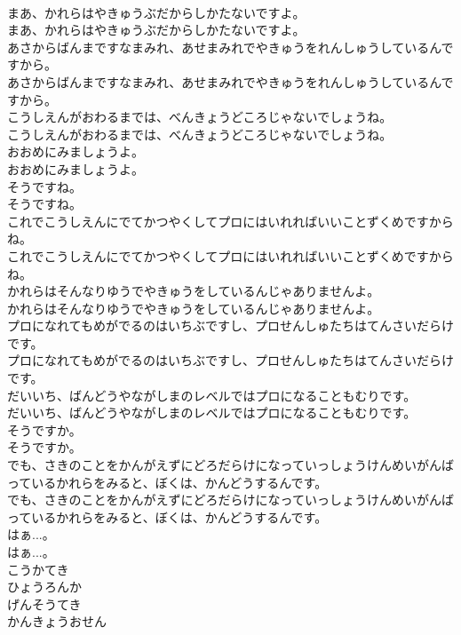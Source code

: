 \documentclass[8pt]{extreport}
\begin{document}
\begin{CJK}{UTF8}{min}
\\	まあ、かれらはやきゅうぶだからしかたないですよ。	
\\	まあ、かれらはやきゅうぶだからしかたないですよ。 
\\	あさからばんまですなまみれ、あせまみれでやきゅうをれんしゅうしているんですから。	
\\	あさからばんまですなまみれ、あせまみれでやきゅうをれんしゅうしているんですから。 
\\	こうしえんがおわるまでは、べんきょうどころじゃないでしょうね。	
\\	こうしえんがおわるまでは、べんきょうどころじゃないでしょうね。 
\\	おおめにみましょうよ。	
\\	おおめにみましょうよ。 
\\	そうですね。	
\\	そうですね。 
\\	これでこうしえんにでてかつやくしてプロにはいれればいいことずくめですからね。	
\\	これでこうしえんにでてかつやくしてプロにはいれればいいことずくめですからね。 
\\	かれらはそんなりゆうでやきゅうをしているんじゃありませんよ。	
\\	かれらはそんなりゆうでやきゅうをしているんじゃありませんよ。 
\\	プロになれてもめがでるのはいちぶですし、プロせんしゅたちはてんさいだらけです。	
\\	プロになれてもめがでるのはいちぶですし、プロせんしゅたちはてんさいだらけです。 
\\	だいいち、ばんどうやながしまのレベルではプロになることもむりです。	
\\	だいいち、ばんどうやながしまのレベルではプロになることもむりです。 
\\	そうですか。	
\\	そうですか。 
\\	でも、さきのことをかんがえずにどろだらけになっていっしょうけんめいがんばっているかれらをみると、ぼくは、かんどうするんです。	
\\	でも、さきのことをかんがえずにどろだらけになっていっしょうけんめいがんばっているかれらをみると、ぼくは、かんどうするんです。 
\\	はぁ...。	
\\	はぁ...。 
\\	こうかてき
\\	ひょうろんか
\\	げんそうてき
\\	かんきょうおせん

\end{CJK}
\end{document}
